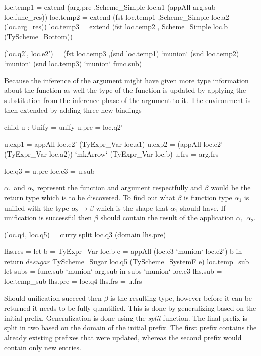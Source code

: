 \begin{code}
loc.temp1 = extend (arg.pre
                   ,Scheme_Simple loc.a1 (appAll arg.sub loc.func_res))
loc.temp2 = extend (fst loc.temp1
                   ,Scheme_Simple loc.a2 (loc.arg_res))
loc.temp3 = extend (fst loc.temp2
                   , Scheme_Simple loc.b  (TyScheme_Bottom))
    
(loc.q2', loc.e2') 
   = (fst loc.temp3
     ,(snd loc.temp1) `munion` (snd loc.temp2) 
                      `munion` (snd loc.temp3) 
                      `munion` func.sub)
\end{code}
Because the inference of the argument might have given more type information about the function as well the type of the function is updated by applying the substitution from the inference phase of the argument to it. The environment is then extended by adding three new bindings 

\begin{code}
child u : Unify = unify
u.pre  = loc.q2'
    
u.exp1 = appAll loc.e2' (TyExpr_Var loc.a1)
u.exp2 = (appAll loc.e2' (TyExpr_Var loc.a2)) `mkArrow` (TyExpr_Var loc.b)
u.frs  = arg.frs
    
loc.q3 = u.pre
loc.e3 = u.sub
\end{code}
$\alpha_1$ and $\alpha_2$ represent the function and argument respectfully and $\beta$ would be the return type which is to be discovered. To find out what $\beta$ is function type $\alpha_1$ is unified with the type $\alpha_2 \rightarrow \beta$ which is the shape that $\alpha_1$ should have. If unification is successful then $\beta$ should contain the result of the application $\alpha_1 \hspace{5pt} \alpha_2$.


\begin{code}       
(loc.q4, loc.q5) = curry split loc.q3 (domain lhs.pre)
 
lhs.res = let b = TyExpr_Var loc.b
              e = appAll (loc.e3 `munion` loc.e2') b
          in return $ desugar $ TyScheme_Sugar loc.q5 (TyScheme_SystemF e)
loc.temp_sub = let subs = func.sub `munion` arg.sub 
               in subs `munion` loc.e3
lhs.sub = loc.temp_sub
lhs.pre = loc.q4
lhs.frs = u.frs
\end{code}
Should unification succeed then $\beta$ is the resulting type, however before it can be returned it needs to be fully quantified. This is done by generalizing based on the initial prefix. Generalization is done using the \emph{split} function. The final prefix is split in two based on the domain of the initial prefix. The first prefix contains the already existing prefixes that were updated, whereas the second prefix would contain only new entries.

